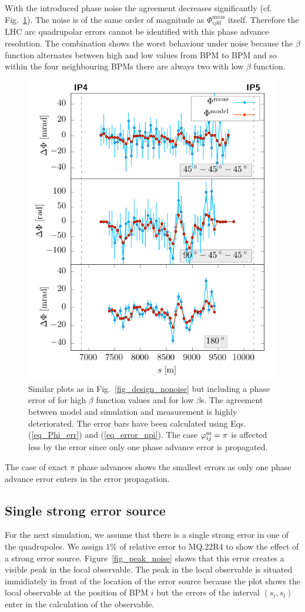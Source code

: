 With the introduced phase noise the agreement decreases significantly (cf. Fig.~\ref{fig_design_noise}). The noise is of the same order of magnitude
as $\Phi_{ijkl}^\text{meas}$ itself.
Therefore the LHC arc quadrupolar errors cannot be identified with this phase advance resolution.
The combination  shows the worst behaviour under noise because the $\beta$
function alternates between high and low values from BPM to BPM and so within the four neighbouring
BPMs there are always two with low $\beta$ function.
%
\begin{figure}
  \centering
  \includegraphics[width=.6\linewidth]{sim_noise}
  \caption{
    Similar plots as in Fig.~\ref{fig_design_nonoise} but including a phase error of \noiserms{} for
    high $\beta$ function values and \highnoise{} for low $\beta$s.
    The agreement between model and simulation and measurement is highly deteriorated.
    The error bars have been calculated using Eqs. (\ref{eq_Phi_err}) and (\ref{eq_error_npi}).
    The case $\varphi_{ij}^\text{m}=\pi$ is affected less by the error since only one phase advance error
    is propagated.
  }
  \label{fig_design_noise}
\end{figure}
%
The case of exact $\pi$ phase advances shows the smallest errors as only one phase advance
error enters in the error propagation.

\subsection{Single strong error source}

For the next simulation, we assume that there is a single strong error in one of the quadrupoles. We
assign $1\%$ of relative error to MQ.22R4 to show the effect of a strong error source. Figure~\ref{fig_peak_noise}
shows that this error creates a visible peak in the local observable.
The peak in the local observable is situated immidiately in front of the location of the error source
because the plot shows the local observable at the position of BPM $i$ but the errors of the interval
$(s_i, s_l)$ enter in the calculation of the observable.

